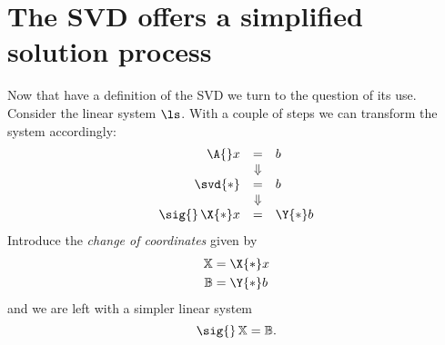 \section{The SVD offers a simplified solution process}
Now that have a definition of the SVD we turn to the question of its use. Consider the linear system $\ls$. With a couple of steps we can transform the system accordingly:
\begin{equation}
  \begin{array}{rcl}
  \A{}x &=& b \\
   &\Downarrow\\
   \svd{*} &=& b\\
   &\Downarrow\\
   \sig{}\, \X{*} x &=& \Y{*} b
  \end{array}
\end{equation}
Introduce the \textit{change of coordinates} given by
\begin{equation}
  \begin{split}
    \mathbb{X} & = \X{*} x  \\
    \mathbb{B} & = \Y{*} b
  \end{split}
\end{equation}
and we are left with a simpler linear system
\begin{equation}
    \sig{}\, \mathbb{X} = \mathbb{B}.
    \label{eq:formal:svdsoln}
\end{equation}

